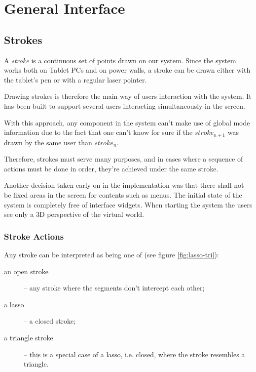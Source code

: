 \section{General Interface}

\subsection{Strokes}

A \emph{stroke} is a continuous set of points drawn on our system.
Since the system works both on Tablet PCs and on power walls,
a stroke can be drawn either with the tablet's pen or with
a regular laser pointer.

Drawing strokes is therefore the main way of users interaction with
the system. It has been built to support several users interacting
simultaneously in the screen.

With this approach, any component in the system can't make use
of global mode information due to the fact that one can't know
for sure if the $ stroke_{n+1} $ was drawn by the same user than $ stroke_{n} $.

Therefore, strokes must serve many purposes, and in cases where a sequence
of actions must be done in order, they're achieved under the same stroke.

Another decision taken early on in the implementation was that there shall not be
fixed areas in the screen for contents such as menus. The initial state of the
system is completely free of interface widgets. When starting the system the users
see only a 3D perspective of the virtual world.


\subsubsection{Stroke Actions}

Any stroke can be interpreted as being one of (see figure \ref{fig:lasso-tri}):

\begin{description}
		\item[an open stroke] --
				any stroke where the segments don't intercept each other;

		\item[a lasso] --
				a closed stroke;

		\item[a triangle stroke] --
				this is a special case of a lasso, i.e. closed, where the stroke resembles a triangle.
\end{description}



